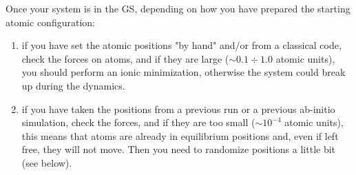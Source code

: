 \documentclass[12pt,a4paper]{article}
\begin{document}
Once your system is in the GS, depending on how you have prepared the starting
atomic configuration:
\begin{enumerate}
\item
if you have set the atomic positions "by hand" and/or from a classical code, 
check the forces on atoms, and if they are large ($\sim 0.1 \div 1.0$
atomic units), you should perform an ionic minimization, otherwise the
system could break up during the dynamics.
\item
if you have taken the positions from a previous run or a previous ab-initio 
simulation, check the forces, and if they are too small ($\sim 10^{-4}$ 
atomic units), this means that atoms are already in equilibrium positions 
and, even if left free, they will not move. Then you need to randomize 
positions a little bit (see below).
\end{enumerate}
\end{document}
